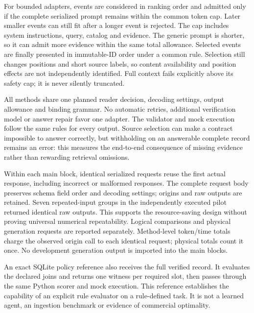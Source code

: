 For bounded adapters, events are considered in ranking order and admitted only if the complete serialized prompt remains within the common token cap. Later smaller events can still fit after a longer event is rejected. The cap includes system instructions, query, catalog and evidence. The generic prompt is shorter, so it can admit more evidence within the same total allowance. Selected events are finally presented in immutable-ID order under a common rule. Selection still changes positions and short source labels, so content availability and position effects are not independently identified. Full context fails explicitly above its safety cap; it is never silently truncated.

All methods share one planned reader decision, decoding settings, output allowance and binding grammar. No automatic retries, additional verification model or answer repair favor one adapter. The validator and mock execution follow the same rules for every output. Source selection can make a contract impossible to answer correctly, but withholding on an answerable complete record remains an error: this measures the end-to-end consequence of missing evidence rather than rewarding retrieval omissions.

Within each main block, identical serialized requests reuse the first actual response, including incorrect or malformed responses. The complete request body preserves schema field order and decoding settings; origins and raw outputs are retained. Seven repeated-input groups in the independently executed pilot returned identical raw outputs. This supports the resource-saving design without proving universal numerical repeatability. Logical comparisons and physical generation requests are reported separately. Method-level token/time totals charge the observed origin call to each identical request; physical totals count it once. No development generation output is imported into the main blocks.

An exact SQLite policy reference also receives the full verified record. It evaluates the declared joins and returns one witness per required slot, then passes through the same Python scorer and mock execution. This reference establishes the capability of an explicit rule evaluator on a rule-defined task. It is not a learned agent, an ingestion benchmark or evidence of commercial optimality.

